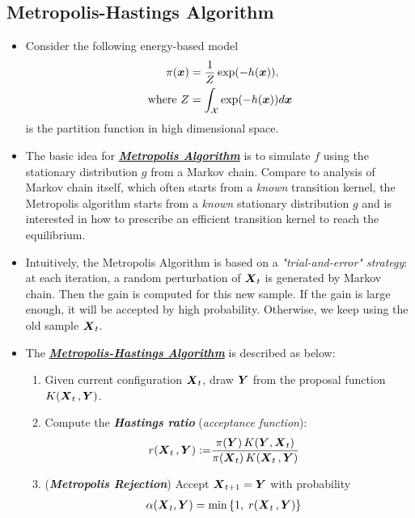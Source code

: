 \documentclass[11pt]{article}
\begin{document}
\subsection{Metropolis-Hastings Algorithm}
\begin{itemize}
\item Consider the following energy-based model
\begin{align*}
\pi(\boldsymbol{x}) &= \frac{1}{Z}\exp(- h(\boldsymbol{x})),\\
\text{where }Z&= \int_{{\mathcal X}}\exp(- h(\boldsymbol{x}))  d\boldsymbol{x} 
\end{align*} is the partition function in high dimensional space.

\item The basic idea for \underline{\emph{\textbf{Metropolis Algorithm}}} is to simulate $f$ using the stationary distribution $g$ from a Markov chain. Compare to analysis of Markov chain itself, which often starts from a \emph{known} transition kernel, the Metropolis algorithm starts from a \emph{known} stationary distribution $g$ and is interested in how to prescribe an efficient transition kernel to reach the equilibrium.

\item Intuitively, the Metropolis Algorithm is based on a \emph{"trial-and-error" strategy}: at each iteration, a random perturbation of $\boldsymbol{X}_{t}$ is generated by Markov chain. Then the gain is computed for this new sample. If the gain is large enough, it will be accepted by high probability. Otherwise, we keep using the old sample $\boldsymbol{X}_{t}$.

\item The \underline{\emph{\textbf{Metropolis-Hastings Algorithm}}} is described as below:
\begin{enumerate}
\item Given current configuration $\boldsymbol{X}_{t}$, draw $\boldsymbol{Y}$ from the proposal function $K(\boldsymbol{X}_{t}\,, \boldsymbol{Y})$.

\item Compute the \emph{\textbf{Hastings ratio}} (\emph{acceptance function}):
\begin{align}
r(\boldsymbol{X}_{t}\,, \boldsymbol{Y}):= &\frac{\pi(\boldsymbol{Y})\,K(\boldsymbol{Y}, \boldsymbol{X}_{t})}{\pi(\boldsymbol{X}_{t})\,K(\boldsymbol{X}_{t}\,, \boldsymbol{Y})} \label{eqn: mh_hastings_ratio}
\end{align}

\item (\emph{\textbf{Metropolis Rejection}})  Accept $\boldsymbol{X}_{t+1} = \boldsymbol{Y}$ with probability
\begin{align*}
\alpha(\boldsymbol{X}_{t}, \boldsymbol{Y}) &= \min\left\{1,\;r(\boldsymbol{X}_{t}\,, \boldsymbol{Y})\right\}
\end{align*}


\end{enumerate}
\end{itemize}
\end{document}
